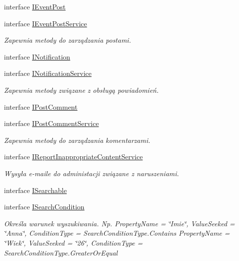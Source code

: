 \begin{DoxyCompactItemize}
interface \hyperlink{interface_contract_1_1_i_event_post}{I\+Event\+Post}
\item 
interface \hyperlink{interface_contract_1_1_i_event_post_service}{I\+Event\+Post\+Service}
\begin{DoxyCompactList}\small\item\em Zapewnia metody do zarządzania postami. \end{DoxyCompactList}\item 
interface \hyperlink{interface_contract_1_1_i_notification}{I\+Notification}
\item 
interface \hyperlink{interface_contract_1_1_i_notification_service}{I\+Notification\+Service}
\begin{DoxyCompactList}\small\item\em Zapewnia metody związane z obsługą powiadomień. \end{DoxyCompactList}\item 
interface \hyperlink{interface_contract_1_1_i_post_comment}{I\+Post\+Comment}
\item 
interface \hyperlink{interface_contract_1_1_i_post_comment_service}{I\+Post\+Comment\+Service}
\begin{DoxyCompactList}\small\item\em Zapewnia metody do zarządzania komentarzami. \end{DoxyCompactList}\item 
interface \hyperlink{interface_contract_1_1_i_report_inappropriate_content_service}{I\+Report\+Inappropriate\+Content\+Service}
\begin{DoxyCompactList}\small\item\em Wysyła e-\/maile do administacji związane z naruszeniami. \end{DoxyCompactList}\item 
interface \hyperlink{interface_contract_1_1_i_searchable}{I\+Searchable}
\item 
interface \hyperlink{interface_contract_1_1_i_search_condition}{I\+Search\+Condition}
\begin{DoxyCompactList}\small\item\em Określa warunek wyszukiwania. Np. Property\+Name = \char`\"{}\+Imie\char`\"{}, Value\+Seeked = \char`\"{}\+Anna\char`\"{}, Condition\+Type = Search\+Condition\+Type.\+Contains Property\+Name = \char`\"{}\+Wiek\char`\"{}, Value\+Seeked = \char`\"{}26\char`\"{}, Condition\+Type = Search\+Condition\+Type.\+Greater\+Or\+Equal \end{DoxyCompactList}\item 

\end{DoxyCompactItemize}
